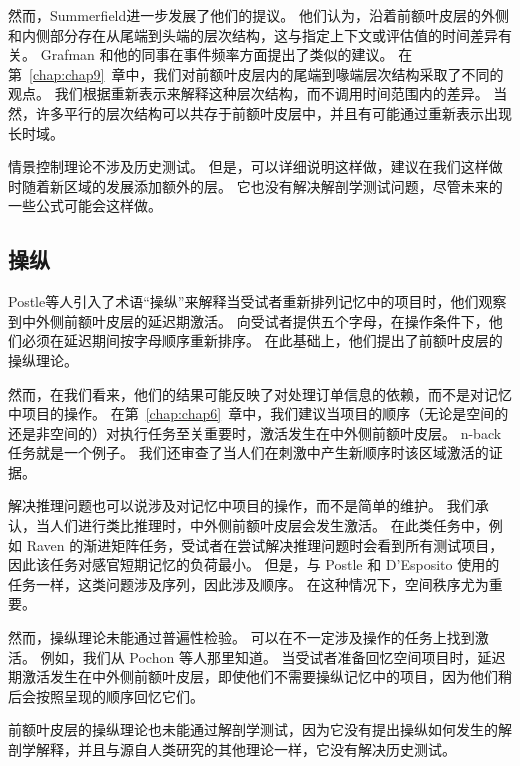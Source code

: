然而，Summerfield\cite{summerfield2009decision}进一步发展了他们的提议。
他们认为，沿着前额叶皮层的外侧和内侧部分存在从尾端到头端的层次结构，这与指定上下文或评估值的时间差异有关。
Grafman 和他的同事\cite{krueger2007event}在事件频率方面提出了类似的建议。
在第~\ref{chap:chap9}~章中，我们对前额叶皮层内的尾端到喙端层次结构采取了不同的观点。
我们根据重新表示来解释这种层次结构，而不调用时间范围内的差异。
当然，许多平行的层次结构可以共存于前额叶皮层中，并且有可能通过重新表示出现长时域。
\par


情景控制理论不涉及历史测试。
但是，可以详细说明这样做，建议在我们这样做时随着新区域的发展添加额外的层。
它也没有解决解剖学测试问题，尽管未来的一些公式可能会这样做。



\subsection{操纵}

Postle等人\cite{postle1999functional}引入了术语“操纵”来解释当受试者重新排列记忆中的项目时，他们观察到中外侧前额叶皮层的延迟期激活。
向受试者提供五个字母，在操作条件下，他们必须在延迟期间按字母顺序重新排序。
在此基础上，他们提出了前额叶皮层的操纵理论。
\par


然而，在我们看来，他们的结果可能反映了对处理订单信息的依赖，而不是对记忆中项目的操作。
在第~\ref{chap:chap6}~章中，我们建议当项目的顺序（无论是空间的还是非空间的）对执行任务至关重要时，激活发生在中外侧前额叶皮层。
n-back 任务就是一个例子。 我们还审查了当人们在刺激中产生新顺序时该区域激活的证据。
\par


解决推理问题也可以说涉及对记忆中项目的操作，而不是简单的维护。
我们承认，当人们进行类比推理时，中外侧前额叶皮层会发生激活\cite{prabhakaran1997neural}。
在此类任务中，例如 Raven 的渐进矩阵任务，受试者在尝试解决推理问题时会看到所有测试项目，因此该任务对感官短期记忆的负荷最小。
但是，与 Postle 和 D'Esposito 使用的任务一样，这类问题涉及序列，因此涉及顺序。
在这种情况下，空间秩序尤为重要。
\par


然而，操纵理论未能通过普遍性检验。
可以在不一定涉及操作的任务上找到激活。 例如，我们从 Pochon 等人那里知道\cite{pochon2001role}。
当受试者准备回忆空间项目时，延迟期激活发生在中外侧前额叶皮层，即使他们不需要操纵记忆中的项目，因为他们稍后会按照呈现的顺序回忆它们。
\par


前额叶皮层的操纵理论也未能通过解剖学测试，因为它没有提出操纵如何发生的解剖学解释，并且与源自人类研究的其他理论一样，它没有解决历史测试。




